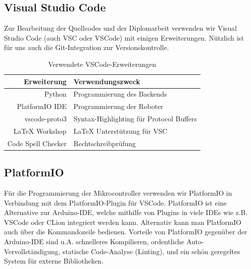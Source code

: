 \subsection{Visual Studio Code}
Zur Bearbeitung der Quellcodes und der Diplomarbeit verwenden wir Visual Studio Code (auch VSC oder VSCode) mit einigen Erweiterungen.
%
Nützlich ist für uns auch die Git-Integration zur Versionskontrolle.
\begin{table}[H]
    \centering
    \begin{tabular}{r|l}
        Erweiterung         & Verwendungszweck \\ \hline
        Python              & Programmierung des Backends \\
        PlatformIO IDE      & Programmierung der Roboter \\
        vscode-proto3       & Syntax-Highlighting für Protocol Buffers \\
        LaTeX Workshop      & LaTeX Unterstützung für VSC \\
        Code Spell Checker  & Rechtschreibprüfung \\
    \end{tabular}
    \caption{Verwendete VSCode-Erweiterungen}
    \label{tab:vsc_plugins}
\end{table}
\subsection{PlatformIO}
Für die Programmierung der Mikrocontroller verwenden wir PlatformIO \cite{platformio} in Verbindung mit dem PlatformIO-Plugin für VSCode.
%
PlatformIO ist eine Alternative zur Arduino-IDE,
welche mithilfe von Plugins in viele IDEs wie z.B. VSCode oder CLion integriert werden kann.
%
Alternativ kann man PlatformIO auch über die Kommandozeile bedienen.
%
Vorteile von PlatformIO gegenüber der Arduino-IDE sind u.A. schnelleres Kompilieren,
ordentliche Auto-Vervollständigung,
statische Code-Analyse (Linting),
und ein schön geregeltes System für externe Bibliotheken.

